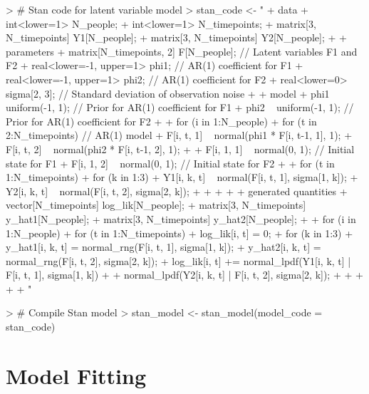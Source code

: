 \documentclass{article}
\begin{document}
\begin{Schunk}
\begin{Sinput}
> # Stan code for latent variable model
> stan_code <- "
+ data {
+   int<lower=1> N_people;
+   int<lower=1> N_timepoints;
+   matrix[3, N_timepoints] Y1[N_people];
+   matrix[3, N_timepoints] Y2[N_people];
+ }
+ parameters {
+   matrix[N_timepoints, 2] F[N_people]; // Latent variables F1 and F2
+   real<lower=-1, upper=1> phi1;        // AR(1) coefficient for F1
+   real<lower=-1, upper=1> phi2;        // AR(1) coefficient for F2
+   real<lower=0> sigma[2, 3];           // Standard deviation of observation noise
+ }
+ model {
+   phi1 ~ uniform(-1, 1); // Prior for AR(1) coefficient for F1
+   phi2 ~ uniform(-1, 1); // Prior for AR(1) coefficient for F2
+ 
+   for (i in 1:N_people) {
+     for (t in 2:N_timepoints) { // AR(1) model
+       F[i, t, 1] ~ normal(phi1 * F[i, t-1, 1], 1);
+       F[i, t, 2] ~ normal(phi2 * F[i, t-1, 2], 1);
+     }
+     F[i, 1, 1] ~ normal(0, 1); // Initial state for F1
+     F[i, 1, 2] ~ normal(0, 1); // Initial state for F2
+ 
+     for (t in 1:N_timepoints) {
+       for (k in 1:3) {
+         Y1[i, k, t] ~ normal(F[i, t, 1], sigma[1, k]);
+         Y2[i, k, t] ~ normal(F[i, t, 2], sigma[2, k]);
+       }
+     }
+   }
+ }
+ generated quantities {
+   vector[N_timepoints] log_lik[N_people];
+   matrix[3, N_timepoints] y_hat1[N_people];
+   matrix[3, N_timepoints] y_hat2[N_people];
+   
+   for (i in 1:N_people) {
+     for (t in 1:N_timepoints) {
+       log_lik[i, t] = 0;
+       for (k in 1:3) {
+         y_hat1[i, k, t] = normal_rng(F[i, t, 1], sigma[1, k]);
+         y_hat2[i, k, t] = normal_rng(F[i, t, 2], sigma[2, k]);
+         log_lik[i, t] += normal_lpdf(Y1[i, k, t] | F[i, t, 1], sigma[1, k]) +
+                          normal_lpdf(Y2[i, k, t] | F[i, t, 2], sigma[2, k]);
+       }
+     }
+   }
+ }
+ "
\end{Sinput}
\end{Schunk}

\begin{Schunk}
\begin{Sinput}
> # Compile Stan model
> stan_model <- stan_model(model_code = stan_code)
\end{Sinput}
\end{Schunk}

\section{Model Fitting}
\end{document}
